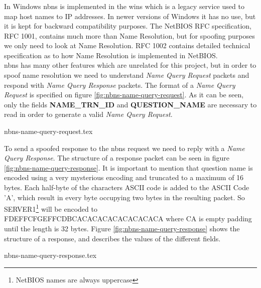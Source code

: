 \documentclass{article}
\begin{document}

\subsubsection{}
\label{sec:nbns}
In Windows \gls{nbns} is implemented in the \gls{wins} which is a legacy service used to map host names to IP addresses. In newer versions of Windows it has no use, but it is kept for backward compatibility purposes. The NetBIOS RFC specification, RFC 1001\cite{url:rfc:netbios}, contains much more than Name Resolution, but for spoofing purposes we only need to look at Name Resolution.
RFC 1002\cite{url:rfc:netbios-technical} contains detailed technical specification as to how Name Resolution is implemented in NetBIOS.\\
\gls{nbns} has many other features which are unrelated for this project, but in order to spoof name resolution we need to understand \emph{Name Query Request} packets and respond with \emph{Name Query Response} packets. The format of a \emph{Name Query Request} is specified on figure \ref{fig:nbns-name-query-request}. As it can be seen, only the fields \textbf{NAME\_TRN\_ID} and \textbf{QUESTION\_NAME} are necessary to read in order to generate a valid \emph{Name Query Request}.

{nbns-name-query-request.tex}

To send a spoofed response to the \gls{nbns} request we need to reply with a \emph{Name Query Response}. The structure of a response packet can be seen in figure \ref{fig:nbns-name-query-response}. It is important to mention that question name is encoded using a very mysterious encoding and truncated to a maximum of 16 bytes. Each half-byte of the characters ASCII code is added to the ASCII Code 'A'\cite{url:nbns-name-encoding}, which result in every byte occupying two bytes in the resulting packet. So SERVER1\footnote{NetBIOS names are always uppercase} will be encoded to FDEFFCFGEFFCDBCACACACACACACACACA where CA is empty padding until the length is 32 bytes. Figure \ref{fig:nbns-name-query-response} shows the structure of a response, and describes the values of the different fields.

{nbns-name-query-response.tex}
\end{document}
